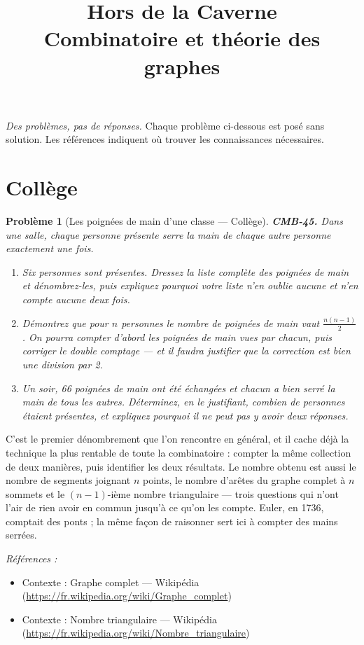 \documentclass[11pt]{article}
\title{Hors de la Caverne \\ \Large Combinatoire et théorie des graphes}
\author{}
\date{}
\newtheorem{problem}{Problème}
\newenvironment{refs}{\par\small\noindent\emph{Références :}\begin{itemize}\setlength\itemsep{0pt}}{\end{itemize}\normalsize}
\begin{document}
\maketitle
\noindent\emph{Des problèmes, pas de réponses.} Chaque problème ci-dessous est posé
sans solution. Les références indiquent où trouver les connaissances nécessaires.
\medskip


\section*{Collège}

\begin{problem}[{Les poignées de main d'une classe --- Collège}]
\textbf{CMB-45.} Dans une salle, chaque personne présente serre la main de chaque autre personne
exactement une fois.
\begin{enumerate}
\item[(a)] Six personnes sont présentes. Dressez la liste complète des poignées de main et dénombrez-les,
puis expliquez pourquoi votre liste n'en oublie aucune et n'en compte aucune deux fois.
\item[(b)] Démontrez que pour $ n $ personnes le nombre de poignées de main vaut $ \frac{n(n-1)}{2} $.
On pourra compter d'abord les poignées de main \og{} vues \fg{} par chacun, puis corriger le double
comptage --- et il faudra justifier que la correction est bien une division par 2.
\item[(c)] Un soir, 66 poignées de main ont été échangées et chacun a bien serré la main de tous les
autres. Déterminez, en le justifiant, combien de personnes étaient présentes, et expliquez pourquoi
il ne peut pas y avoir deux réponses.
\end{enumerate}

\end{problem}

\noindent C'est le premier dénombrement que l'on rencontre en général, et il cache déjà la
technique la plus rentable de toute la combinatoire : compter la même collection de deux manières,
puis identifier les deux résultats. Le nombre obtenu est aussi le nombre de segments joignant
$ n $ points, le nombre d'arêtes du graphe complet à $ n $ sommets et le $ (n-1) $-ième nombre
triangulaire --- trois questions qui n'ont l'air de rien avoir en commun jusqu'à ce qu'on les compte.
Euler, en 1736, comptait des ponts ; la même façon de raisonner sert ici à compter des mains
serrées.

\begin{refs}
\item Contexte : Graphe complet --- Wikipédia (\url{https://fr.wikipedia.org/wiki/Graphe_complet})
\item Contexte : Nombre triangulaire --- Wikipédia (\url{https://fr.wikipedia.org/wiki/Nombre_triangulaire})
\end{refs}
\end{document}
